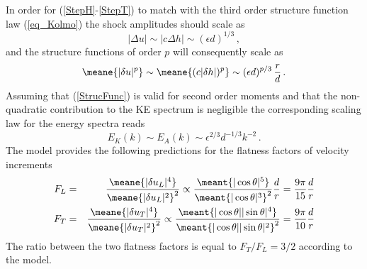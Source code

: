 In order for (\ref{StepH}-\ref{StepT}) to match with the third order structure function law (\ref{eq_Kolmo})  the shock amplitudes should scale as
\begin{equation} \label{Strength}
 | \Delta u | \sim | c \Delta h | \sim (\epsilon d)^{1/3} \, ,
\end{equation} 
and the structure functions of order $ p $ will consequently scale as
\begin{equation} \label{StrucFunc}
\meane{|\delta u |^p}  \sim \meane{(c|\delta h |)^p} \sim  (\epsilon  d)^{p/3} \,  \frac{r}{d} \, .
\end{equation} 
Assuming that (\ref{StrucFunc}) is valid for second order moments and that the non-quadratic contribution to the KE spectrum is negligible the corresponding scaling law for the energy spectra reads
\begin{equation} \label{Spectra}
E_K(k)  \sim  E_A(k) \sim \epsilon ^{2/3} d^{-1/3} k^{-2} \, .
\end{equation} 
The  model  provides the following predictions for the flatness factors of velocity increments
\begin{eqnarray} \label{FL}
F_L &=&  \frac{\meane{|\delta u_L|^4}}{\meane{|\delta u_L|^2}^2}
\propto 
\frac{\meant{|\cos\theta|^5}}{\meant{|\cos\theta|^3}^2} \frac{d}{r}   = \frac{9\pi}{15}  \frac{d}{r} \\ \label{FT}
F_T &=&  \frac{\meane{|\delta u_T|^4}}{\meane{|\delta u_T|^2}^2} 
\propto
\frac{\meant{|\cos\theta||\sin\theta|^4}}{\meant{|\cos\theta||\sin\theta|^2}^2} =  \frac{9\pi}{10}  \frac{d}{r} 
\end{eqnarray}
The ratio between the two flatness factors is equal  to
$F_T/F_L = 3/2$ according to the model. 

